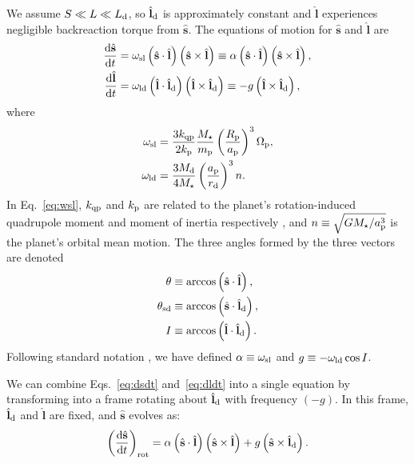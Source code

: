 \documentclass[
        fleqn,
        usenatbib,
    ]{mnras}
\newcommand*{\rd}[2]{\frac{\mathrm{d}#1}{\mathrm{d}#2}}
\newcommand*{\bm}[1]{\boldsymbol{\mathbf{#1}}}
\newcommand*{\uv}[1]{\hat{\bm{#1}}}
\newcommand*{\p}[1]{\left(#1\right)}
\begin{document}
We assume $S \ll L \ll L_{\rm d}$, so $\uv{l}_{\rm d}$ is approximately
constant and $\uv{l}$ experiences negligible backreaction torque from
$\uv{s}$. The equations of motion for $\uv{s}$ and $\uv{l}$
are
\begin{align}
    \rd{\uv{s}}{t} &= \omega_{\rm sl} \p{\uv{s} \cdot \uv{l}}
            \p{\uv{s} \times \uv{l}}
        \equiv \alpha \p{\uv{s} \cdot \uv{l}}
            \p{\uv{s} \times \uv{l}},\label{eq:dsdt}\\
    \rd{\uv{l}}{t} &= \omega_{\rm ld}\p{\uv{l} \cdot \uv{l}_{\rm d}}
            \p{\uv{l} \times \uv{l}_{\rm d}}
        \equiv -g\p{\uv{l} \times \uv{l}_{\rm d}},
            \label{eq:dldt}
\end{align}
where
\begin{align}
    \omega_{\rm sl} &= \frac{3k_{\rm qp}}{2k_{\rm p}} \frac{M_\star}{m_{\rm
        p}} \p{\frac{R_{\rm p}}{a_{\rm p}}}^3 \Omega_{\rm p},\label{eq:wsl}\\
    \omega_{\rm ld} &= \frac{3M_{\rm d}}{4M_\star}\p{\frac{a_{\rm
        p}}{r_{\rm d}}}^3 n .\label{eq:wld}
\end{align}
In Eq.~\eqref{eq:wsl}, $k_{\rm qp}$ and $k_{\rm p}$ are related to the planet's
rotation-induced quadrupole moment and moment of inertia respectively
\citep[see][]{lai2018}, and $n \equiv \sqrt{GM_\star/a_{\rm p}^3}$ is the
planet's orbital mean motion. The three angles formed by the three vectors are
denoted
\begin{align}
    \theta &\equiv \arccos \p{\uv{s} \cdot \uv{l}},\\
    \theta_{\rm sd} &\equiv \arccos \p{\uv{s} \cdot \uv{l}_{\rm d}},\\
    I &\equiv \arccos \p{\uv{l} \cdot \uv{l}_{\rm d}}.
\end{align}
Following standard notation \citep[e.g.][]{colombo1966,peale1969,ward_jupiter},
we have defined $\alpha \equiv \omega_{\rm sl}$ and $g \equiv -\omega_{\rm
ld}\cos I$.

We can combine Eqs.~\eqref{eq:dsdt} and~\eqref{eq:dldt} into a single equation
by transforming into a frame rotating about $\uv{l}_{\rm d}$ with
frequency $(-g)$. In this frame, $\uv{l}_{\rm d}$ and $\uv{l}$ are fixed, and
$\uv{s}$ evolves as:
\begin{equation}
    \p{\rd{\uv{s}}{t}}_{\rm rot} = \alpha \p{\uv{s} \cdot \uv{l}}
            \p{\uv{s} \times \uv{l}}
        + g\p{\uv{s} \times \uv{l}_{\rm d}}.\label{eq:dsdt_rot}
\end{equation}
\end{document}
